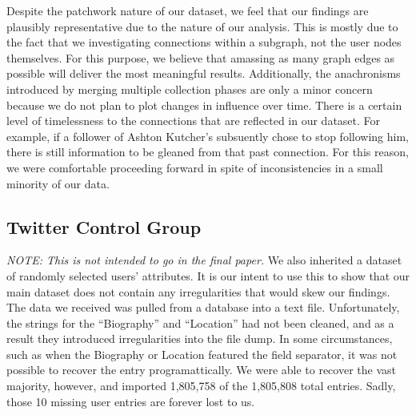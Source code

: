 Despite the patchwork nature of our dataset, we feel that our findings are plausibly representative due to the nature of our analysis.  This is mostly due to the fact that we investigating connections within a subgraph, not the user nodes themselves.  For this purpose, we believe that amassing as many graph edges as possible will deliver the most meaningful results.  Additionally, the anachronisms introduced by merging multiple collection phases are only a minor concern because we do not plan to plot changes in influence over time.  There is a certain level of timelessness to the connections that are reflected in our dataset.  For example, if a follower of Ashton Kutcher's subsuently chose to stop following him, there is still information to be gleaned from that past connection.  For this reason, we were comfortable proceeding forward in spite of inconsistencies in a small minority of our data.

\subsection{Twitter Control Group}
\textit{NOTE: This is not intended to go in the final paper.}  We also inherited a dataset of randomly selected users' attributes.  It is our intent to use this to show that our main dataset does not contain any irregularities that would skew our findings.  The data we received was pulled from a database into a text file.  Unfortunately, the strings for the ``Biography'' and ``Location'' had not been cleaned, and as a result they introduced irregularities into the file dump.  In some circumstances, such as when the Biography or Location featured the field separator, it was not possible to recover the entry programattically.  We were able to recover the vast majority, however, and imported 1,805,758 of the 1,805,808 total entries.  Sadly, those 10 missing user entries are forever lost to us.


